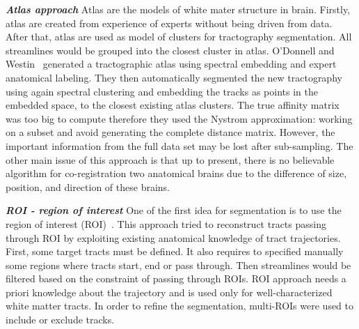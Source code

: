 \textbf{\textit{Atlas approach}}
Atlas are the models of white mater structure in brain. 
Firstly, atlas are created from experience of experts without being driven from data. After that, atlas are used as model of clusters for tractography segmentation. All streamlines would be grouped into the closest cluster in atlas. O'Donnell and Westin~\cite{odonnell2007automatic} generated a tractographic atlas using spectral embedding and expert anatomical labeling. They then automatically segmented the new tractography using again spectral clustering and embedding the tracks as points in the embedded space, to the closest existing atlas clusters. The true affinity matrix was too big to compute therefore they used the Nystrom approximation: working on a subset and avoid generating the complete distance matrix. However, the important information from the full data set may be lost after sub-sampling. The other main issue of this approach is that up to present, there is no believable algorithm for co-registration two anatomical brains due to the difference of size, position, and direction of these brains.

\textbf{\textit{ROI - region of interest}}
One of the first idea for segmentation is to use the region of interest (ROI)~\cite{wakana2007reproducibility}. This approach tried to reconstruct tracts passing through ROI by exploiting existing anatomical knowledge of tract trajectories. First, some target tracts must be defined. It also requires to specified manually some regions where tracts start, end or pass through. Then streamlines would be filtered based on the constraint of passing through ROIs. ROI approach needs a priori knowledge about the trajectory and is used only for well-characterized white matter tracts.  
In order to refine the segmentation, multi-ROIs were used to include or exclude tracks.

